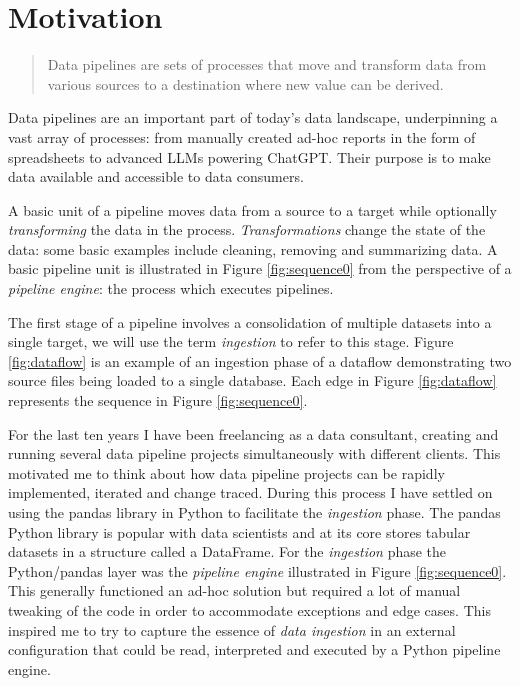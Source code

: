 \section{Motivation}\label{motivation}

\begin{quote}
Data pipelines are sets of processes that move and transform data from
various sources to a destination where new value can be derived.
\citep[p.~1]{pipelines_pocket}
\end{quote}

Data pipelines are an important part of today's data landscape,
underpinning a vast array of processes: from manually created ad-hoc
reports in the form of spreadsheets to advanced LLMs powering ChatGPT.
Their purpose is to make data available and accessible to data
consumers.

A basic unit of a pipeline moves data from a source to a target while
optionally \emph{transforming} the data in the process.
\emph{Transformations} change the state of the data: some basic examples
include cleaning, removing and summarizing data. A basic pipeline unit
is illustrated in Figure \ref{fig:sequence0} from the perspective of a
\emph{pipeline engine}: the process which executes pipelines.



The first stage of a pipeline involves a consolidation of multiple
datasets into a single target, we will use the term \emph{ingestion} to
refer to this stage. Figure \ref{fig:dataflow} is an example of an
ingestion phase of a dataflow demonstrating two source files being
loaded to a single database. Each edge in Figure \ref{fig:dataflow}
represents the sequence in Figure \ref{fig:sequence0}.



For the last ten years I have been freelancing as a data consultant,
creating and running several data pipeline projects simultaneously with
different clients. This motivated me to think about how data pipeline
projects can be rapidly implemented, iterated and change traced. During
this process I have settled on using the pandas library in Python to
facilitate the \emph{ingestion} phase. The pandas Python library is
popular with data scientists and at its core stores tabular datasets in
a structure called a DataFrame. For the \emph{ingestion} phase the
Python/pandas layer was the \emph{pipeline engine} illustrated in Figure
\ref{fig:sequence0}. This generally functioned an ad-hoc solution but
required a lot of manual tweaking of the code in order to accommodate
exceptions and edge cases. This inspired me to try to capture the
essence of \emph{data ingestion} in an external configuration that could
be read, interpreted and executed by a Python pipeline engine.

